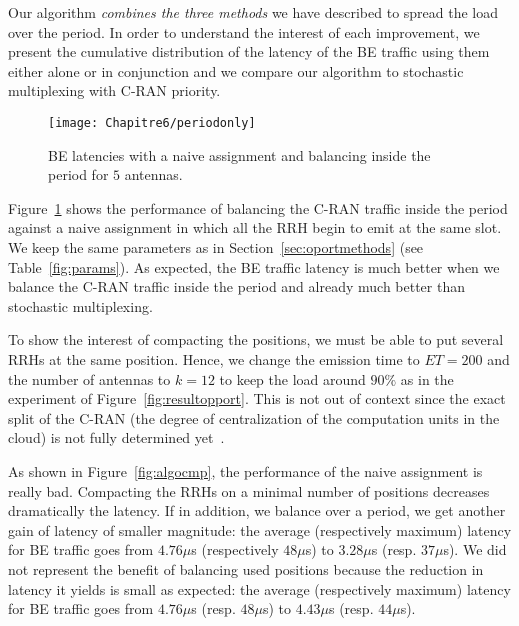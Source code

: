   Our algorithm \emph{combines the three methods} we have described to spread the load over the period.
  In order to understand the interest of each improvement, we present the cumulative distribution of the latency of the BE traffic using them either alone or in conjunction and we compare our algorithm to stochastic multiplexing with C-RAN priority.
   
\begin{figure}[h!]
\begin{center}   

      \texttt{[image: Chapitre6/periodonly]}
     \caption{BE latencies with a naive assignment and balancing inside the period for $5$ antennas.}  
     \label{fig:periodonly}
  \end{center}
  \end{figure}
    
Figure~\ref{fig:periodonly} shows the performance of balancing the C-RAN traffic inside the period against a naive assignment in which all the RRH begin to emit at the same slot. We keep the same parameters as in Section~\ref{sec:oportmethods} (see Table~\ref{fig:params}). As expected, the BE traffic latency is much better when we balance the C-RAN traffic inside the period and already much better than stochastic multiplexing.

To show the interest of compacting the positions, we must be able to put several RRHs at the same position.
Hence, we change the emission time to $ET = 200$ and the number of antennas to $k = 12$ to keep the load around $90\%$ as in the experiment of Figure~\ref{fig:resultopport}. This is not out of context since the exact split of the C-RAN (the degree of centralization of the computation units in the cloud) is not fully determined yet~\cite{mobile2011c}. 



As shown in Figure~\ref{fig:algocmp}, the performance of the naive assignment is really bad. Compacting the RRHs on a minimal number of positions decreases dramatically the latency. If in addition, we balance over a period, we get another gain of latency of smaller magnitude: the average (respectively maximum) latency for BE traffic goes from $4.76 \mu$s (respectively $48 \mu$s) to $3.28 \mu$s (resp. $37 \mu$s).
We did not represent the benefit of balancing used positions because the reduction in latency it yields is small as expected: the average (respectively maximum) latency for BE traffic goes from $4.76 \mu$s (resp. $48 \mu$s) to $4.43 \mu$s (resp. $44 \mu$s). 

